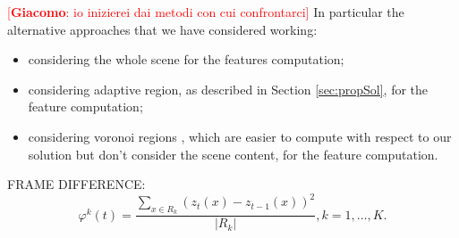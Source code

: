 \documentclass{llncs}
\newcommand{\gi}[1]{{\textcolor{red}{[\small \textbf{Giacomo}: #1]}}}
\begin{document}
\gi{io inizierei dai metodi con cui confrontarci}
In particular the alternative approaches that we have considered working:
\begin{itemize}
\item considering the whole scene for the features computation;
\item considering adaptive region, as described in Section \ref{sec:propSol}, for the feature computation;
\item considering voronoi regions \cite{aurenhammer1991voronoi}, which are easier to compute with respect to our solution but don't consider the scene content, for the feature computation.
\end{itemize}

FRAME DIFFERENCE:
\begin{equation}
	\label{eq:frameDiffReg}
	\varphi^k(t) = \frac{\sum_{x \in R_k}(z_t(x) - z_{t-1}(x))^2}{|R_k|}, k=1,\dots,K.
\end{equation}
\end{document}
